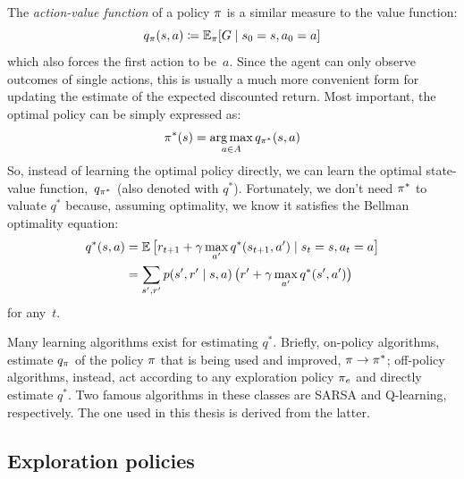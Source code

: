 The \emph{action-value function} of a policy $\pi$ is a similar measure to
the value function:
\begin{equation}
	q_{\pi}(s, a) \coloneqq \mathbb{E}_{\pi}[G \mid s_0 = s, a_0 = a]
\end{equation}
which also forces the first action to be~$a$. Since the agent can only observe
outcomes of single actions, this is usually a much more convenient form for
updating the estimate of the expected discounted return. Most important, the
optimal policy can be simply expressed as:
\begin{equation}
	\pi^*(s) = \operatorname*{arg\,max}_{a \in A} q_{\pi^*}(s, a)
	\label{eq:opt-policy-q}
\end{equation}
So, instead of learning the optimal policy directly, we can learn the optimal
state-value function,~$q_{\pi^*}$ (also denoted with $q^*$). Fortunately,
we don't need $\pi^*$ to valuate $q^*$ because, assuming optimality, we
know it satisfies the Bellman optimality equation:
\begin{align}
	q^*(s, a) &= \mathbb{E}\, \bigl[ r_{t+1} + \gamma \max_{a'} q^*(s_{t+1}, a')
	\mid s_t = s, a_t = a \bigr] \\
	&= \sum_{s', r'} p(s', r' \mid s, a) \,
	\bigl( r' + \gamma \max_{a'} q^*(s', a') \bigr)
	\label{eq:q-bellman}
\end{align}
for any~$t$.

Many learning algorithms exist for estimating $q^*$. Briefly, on-policy
algorithms, estimate $q_\pi$ of the policy $\pi$ that is being used
and improved, $\pi \to \pi^*$; off-policy algorithms, instead, act
according to any exploration policy $\pi_e$ and directly estimate $q^*$.
Two famous algorithms in these classes are SARSA and Q-learning, respectively.
The one used in this thesis is derived from the latter.


\subsection{Exploration policies}

